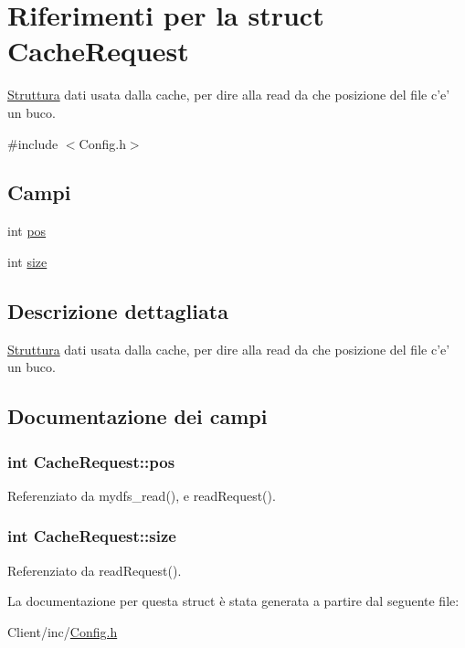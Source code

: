 \hypertarget{structCacheRequest}{\section{Riferimenti per la struct Cache\+Request}
\label{structCacheRequest}
}


\hyperlink{structStruttura}{Struttura} dati usata dalla cache, per dire alla read da che posizione del file c'e' un buco.  




{\ttfamily \#include $<$Config.\+h$>$}

\subsection*{Campi}
\begin{DoxyCompactItemize}
\item 
int \hyperlink{structCacheRequest_a9b1e1f0498ee02f22da75fe915334873}{pos}
\item 
int \hyperlink{structCacheRequest_abc81e438c50064f3dde1835d6146bb1c}{size}
\end{DoxyCompactItemize}


\subsection{Descrizione dettagliata}
\hyperlink{structStruttura}{Struttura} dati usata dalla cache, per dire alla read da che posizione del file c'e' un buco. 

\subsection{Documentazione dei campi}
\hypertarget{structCacheRequest_a9b1e1f0498ee02f22da75fe915334873}{
\subsubsection[{pos}]{\setlength{\rightskip}{0pt plus 5cm}int Cache\+Request\+::pos}}\label{structCacheRequest_a9b1e1f0498ee02f22da75fe915334873}


Referenziato da mydfs\+\_\+read(), e read\+Request().

\hypertarget{structCacheRequest_abc81e438c50064f3dde1835d6146bb1c}{
\subsubsection[{size}]{\setlength{\rightskip}{0pt plus 5cm}int Cache\+Request\+::size}}\label{structCacheRequest_abc81e438c50064f3dde1835d6146bb1c}


Referenziato da read\+Request().



La documentazione per questa struct è stata generata a partire dal seguente file\+:\begin{DoxyCompactItemize}
\item 
Client/inc/\hyperlink{Client_2inc_2Config_8h}{Config.\+h}\end{DoxyCompactItemize}
